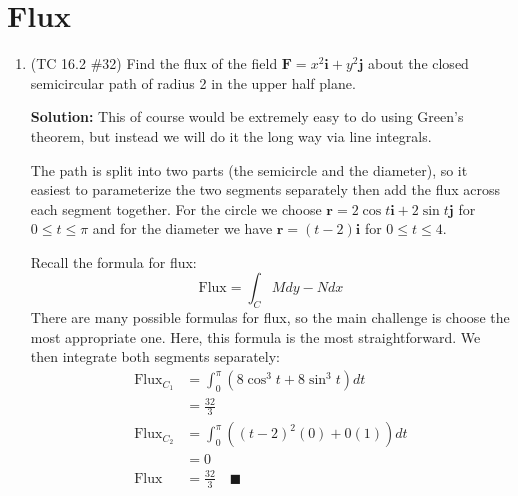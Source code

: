 \documentclass[letterpaper, 11pt]{article}
\begin{document}
\section{Flux}
\begin{enumerate}
\item (TC 16.2 \#32) Find the flux of the field $\bm{F} = x^2 \bm{i} + y^2 \bm{j}$ about the closed semicircular path of radius 2 in the upper half plane. 

\par \textbf{Solution:} This of course would be extremely easy to do using Green's theorem, but instead we will do it the long way via line integrals. 
\par The path is split into two parts (the semicircle and the diameter), so it easiest to parameterize the two segments separately then add the flux across each segment together. For the circle we choose $\bm{r} = 2\cos t \bm{i} + 2\sin t \bm{j}$ for $0 \leq t \leq \pi$ and for the diameter we have $\bm{r} = (t - 2) \bm{i}$ for $ 0 \leq t \leq 4$. 

\par Recall the formula for flux:
\[ \text{Flux} = \int_C Mdy - Ndx \]
There are many possible formulas for flux, so the main challenge is choose the most appropriate one. Here, this formula is the most straightforward. We then integrate both segments separately:
\begin{align*}
\text{Flux}_{C_1} &= \int_0^\pi (8\cos^3 t  + 8 \sin^3 t)dt \\
&= \frac{32}{3} \\
\text{Flux}_{C_2} &= \int_0^\pi ((t - 2)^2(0) + 0(1)) dt \\
&= 0 \\
\text{Flux} &= \frac{32}{3} \quad\blacksquare
\end{align*}

%


\end{enumerate}
\end{document}
